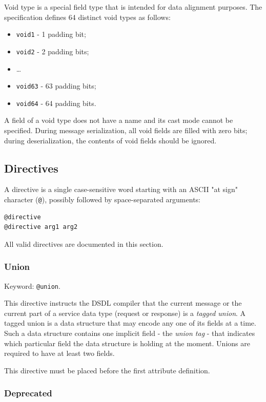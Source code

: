 Void type is a special field type that is intended for data alignment purposes.
The specification defines 64 distinct void types as follows:

\begin{itemize}
    \item \verb|void1| - 1 padding bit;
    \item \verb|void2| - 2 padding bits;
    \item \ldots
    \item \verb|void63| - 63 padding bits;
    \item \verb|void64| - 64 padding bits.
\end{itemize}

A field of a void type does not have a name and its cast mode cannot be specified.
During message serialization, all void fields are filled with zero bits;
during deserialization, the contents of void fields should be ignored.

\subsection{Directives}

A directive is a single case-sensitive word starting with an ASCII "at sign" character (\verb|@|),
possibly followed by space-separated arguments:

\begin{verbatim}
@directive
@directive arg1 arg2
\end{verbatim}

All valid directives are documented in this section.

\subsubsection{Union}

Keyword: \verb|@union|.

This directive instructs the DSDL compiler that the current message or the current part of a service data type
(request or response) is a \emph{tagged union}.
A tagged union is a data structure that may encode any one of its fields at a time.
Such a data structure contains one implicit field - the \emph{union tag} - that indicates which particular
field the data structure is holding at the moment.
Unions are required to have at least two fields.

This directive must be placed before the first attribute definition.

\subsubsection{Deprecated}

